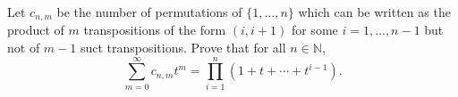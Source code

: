 Let $ c_{n, m}$ be the number of permutations of $ \{1, \ldots, n\}$ which can be written as the product of $ m$ transpositions of the form $ (i, i+1)$ for some $ i=1, \ldots, n-1$ but not of $ m-1$ suct transpositions. Prove that for all $ n \in \mathbb{N}$,\[ \sum_{m=0}^\infty c_{n, m}t^{m}= \prod_{i=1}^{n}(1+t+\cdots+t^{i-1}). \]